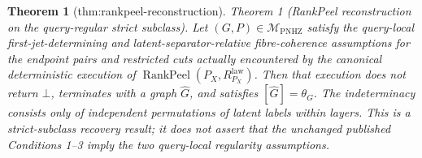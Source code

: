 \documentclass{article}
\newtheorem{theorem}{Theorem}
\begin{document}
\begin{theorem}[thm:rankpeel-reconstruction]\label{thm:rankpeel-reconstruction}
Theorem 1 (RankPeel reconstruction on the query-regular strict subclass).  Let \((G,P)\in\mathcal M_{\mathrm{PNHZ}}\) satisfy the query-local first-jet-determining and latent-separator-relative fibre-coherence assumptions for the endpoint pairs and restricted cuts actually encountered by the canonical deterministic execution of \(\operatorname{RankPeel}(P_X,R^{\mathrm{law}}_{P_X})\).  Then that execution does not return \(\bot\), terminates with a graph \(\widehat G\), and satisfies \([\widehat G]=\theta_G\).  The indeterminacy consists only of independent permutations of latent labels within layers.  This is a strict-subclass recovery result; it does not assert that the unchanged published Conditions 1--3 imply the two query-local regularity assumptions.
\end{theorem}
\end{document}
